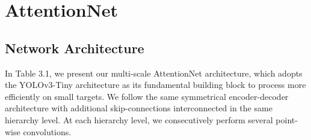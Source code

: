 \section{AttentionNet}
\label{sec:lorem}


\subsection{Network Architecture} %
\label{sub:citations}

In Table 3.1, we present our multi-scale AttentionNet architecture, which adopts the YOLOv3-Tiny\cite{18} architecture as its fundamental building block to process more efficiently on small targets. We follow the same
symmetrical encoder-decoder architecture \cite{17} with additional skip-connections interconnected in the same hierarchy level. At each hierarchy level, we consecutively perform several point-wise convolutions. 

